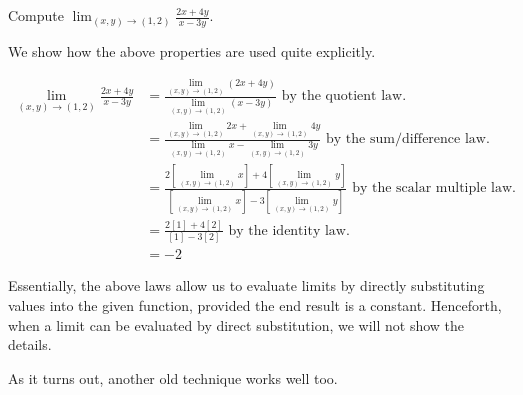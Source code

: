 \documentclass{ximera}
\begin{document}
\begin{example}
Compute $\lim_{(x,y)\to(1,2)} \frac{2x+4y}{x-3y}$.  

\begin{explanation}
We show how the above properties are used quite explicitly.

\begin{align*}
\lim_{(x,y)\to(1,2)} \frac{2x+4y}{x-3y} & = \frac{\lim_{(x,y)\to(1,2)}(2x+4y)}{\lim_{(x,y)\to(1,2)}(x-3y)} \textrm{  by the quotient law. } \\
&=  \frac{\lim_{(x,y)\to(1,2)}2x+\lim_{(x,y)\to(1,2)} 4y}{\lim_{(x,y)\to(1,2)}x-\lim_{(x,y)\to(1,2)}3y}  \textrm{ by the sum/difference law. } \\
&=  \frac{2\left[\lim_{(x,y)\to(1,2)}x\right]+4\left[\lim_{(x,y)\to(1,2)} y\right]}{\left[\lim_{(x,y)\to(1,2)}x\right]-3\left[\lim_{(x,y)\to(1,2)}y\right]}  \textrm{ by the scalar multiple law. } \\
&= \frac{2[1]+4[2]}{[1]-3[2]} \textrm{ by the identity law. } \\
&= -2
\end{align*}
\end{explanation}
\end{example}

Essentially, the above laws allow us to evaluate limits by directly substituting values into the given function, provided the end result is a constant.  Henceforth, when a limit can be evaluated by direct substitution, we will not show the details.  

As it turns out, another old technique works well too.

    
    
\end{document}
